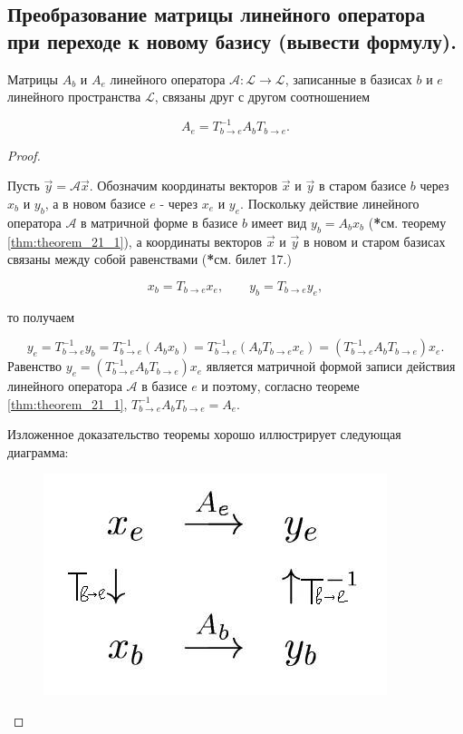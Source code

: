 \subsection{
    Преобразование матрицы линейного оператора при переходе к новому базису (вывести формулу).
}

\begin{theorem}
    Матрицы $A_b$ и $A_e$ линейного оператора $\mathscr{A} \colon \mathcal{L} \to \mathcal{L}$, записанные в базисах $b$ и $e$ линейного пространства $\mathcal{L}$, связаны друг с другом соотношением
    
    $$A_e = T^{-1}_{b \to e}A_bT_{b \to e}.$$
\end{theorem}

\begin{proof}~

    Пусть $\vec{y} = \mathscr{A}\vec{x}$. Обозначим координаты векторов $\vec{x}$ и $\vec{y}$ в старом базисе $b$ через $x_b$ и $y_b$, а в новом базисе $e$ - через $x_e$ и $y_e$. Поскольку действие линейного оператора $\mathscr{A}$ в матричной форме в базисе $b$ имеет вид $y_b = A_bx_b$ (\textbf{*}см. теорему \ref{thm:theorem_21_1}), а координаты векторов $\vec{x}$ и $\vec{y}$ в новом и старом базисах связаны между собой равенствами (\textbf{*}см. билет 17.)

    $$x_b = T_{b \to e}x_e, \quad \quad y_b = T_{b \to e}y_e,$$

    то получаем

    $$y_e = T^{-1}_{b \to e}y_b = T^{-1}_{b \to e}(A_bx_b) = T^{-1}_{b \to e}(A_bT_{b \to e}x_e) = (T^{-1}_{b \to e}A_bT_{b \to e})x_e.$$
    Равенство $y_e = (T^{-1}_{b \to e}A_bT_{b \to e})x_e$ является матричной формой записи действия линейного оператора $\mathscr{A}$ в базисе $e$ и поэтому, согласно теореме \ref{thm:theorem_21_1}, $T^{-1}_{b \to e}A_bT_{b \to e} = A_e$. 

    Изложенное доказательство теоремы хорошо иллюстрирует следующая диаграмма:

    \begin{figure}[H]
        \centering
        \includegraphics[scale=0.5]{images/module2/question22/1.jpg}
        \label{fig:picture_22_1}
    \end{figure}
\end{proof}
